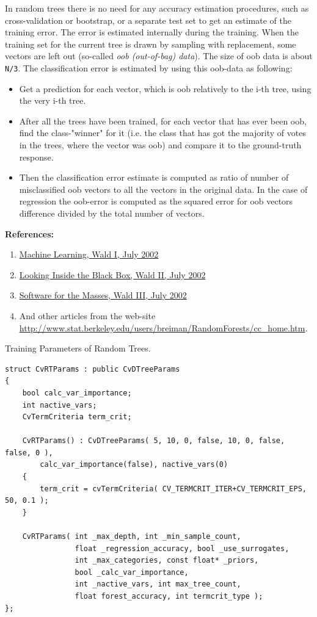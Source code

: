 In random trees there is no need for any accuracy estimation procedures, such as cross-validation or bootstrap, or a separate test set to get an estimate of the training error. The error is estimated internally during the training. When the training set for the current tree is drawn by sampling with replacement, some vectors are left out (so-called \emph{oob (out-of-bag) data}). The size of oob data is about \texttt{N/3}. The classification error is estimated by using this oob-data as following:
\begin{itemize}
\item{Get a prediction for each vector, which is oob relatively to the i-th tree, using the very i-th tree.}
\item{After all the trees have been trained, for each vector that has ever been oob, find the class-"winner" for it (i.e. the class that has got the majority of votes in the trees, where the vector was oob) and compare it to the ground-truth response.}
\item{Then the classification error estimate is computed as ratio of number of misclassified oob vectors to all the vectors in the original data. In the case of regression the oob-error is computed as the squared error for oob vectors difference divided by the total number of vectors.}
\end{itemize}

\textbf{References:}
\begin{enumerate}
\item{\href{http://stat-www.berkeley.edu/users/breiman/wald2002-1.pdf}{Machine Learning, Wald I, July 2002}}
\item{\href{http://stat-www.berkeley.edu/users/breiman/wald2002-2.pdf}{Looking Inside the Black Box, Wald II, July 2002 }}
\item{\href{http://stat-www.berkeley.edu/users/breiman/wald2002-3.pdf}{Software for the Masses, Wald III, July 2002 }}
\item{And other articles from the web-site \url{http://www.stat.berkeley.edu/users/breiman/RandomForests/cc_home.htm}.}
\end{enumerate}


Training Parameters of Random Trees.

\begin{lstlisting}
struct CvRTParams : public CvDTreeParams
{
    bool calc_var_importance;
    int nactive_vars;
    CvTermCriteria term_crit;

    CvRTParams() : CvDTreeParams( 5, 10, 0, false, 10, 0, false, false, 0 ),
        calc_var_importance(false), nactive_vars(0)
    {
        term_crit = cvTermCriteria( CV_TERMCRIT_ITER+CV_TERMCRIT_EPS, 50, 0.1 );
    }

    CvRTParams( int _max_depth, int _min_sample_count,
                float _regression_accuracy, bool _use_surrogates,
                int _max_categories, const float* _priors,
                bool _calc_var_importance,
                int _nactive_vars, int max_tree_count,
                float forest_accuracy, int termcrit_type );
};
\end{lstlisting}

